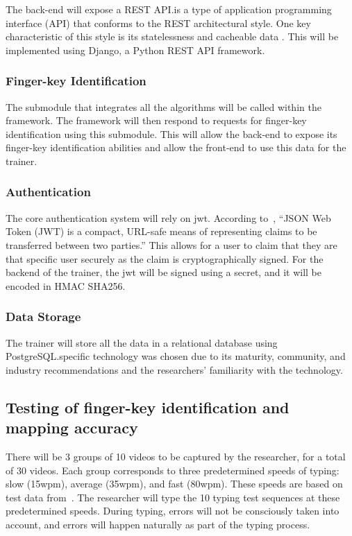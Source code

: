 \documentclass{report}
\begin{document}
The back-end will expose a REST API.\@This is a type of application programming
interface (API) that conforms to the REST architectural style. One key
characteristic of this style is its statelessness and cacheable data
\parencite{rest}. This will be implemented using Django, a Python REST API
framework.

\subsubsection{Finger-key Identification}
The submodule that integrates all the algorithms will be called within the
framework. The framework will then respond to requests for finger-key
identification using this submodule. This will allow the back-end to expose its
finger-key identification abilities and allow the front-end to use this data for
the trainer.

\subsubsection{Authentication}
The core authentication system will rely on \ac{jwt}. According to~\cite{jwt},
``JSON Web Token (JWT) is a compact, URL-safe means of representing claims to be
transferred between two parties.'' This allows for a user to claim that they are
that specific user securely as the claim is cryptographically signed. For the
backend of the trainer, the \ac{jwt} will be signed using a secret, and it will
be encoded in HMAC SHA256.

\subsubsection{Data Storage}
The trainer will store all the data in a relational database using
PostgreSQL.\@This specific technology was chosen due to its maturity, community,
and industry recommendations and the researchers' familiarity with the
technology.

\subsection{Testing of finger-key identification and mapping accuracy}

There will be 3 groups of 10 videos to be captured by the researcher, for a
total of 30 videos. Each group corresponds to three predetermined speeds of
typing: slow (15wpm), average (35wpm), and fast (80wpm). These speeds are based
on test data from~\cite{keybr}. The researcher will type the 10 typing test
sequences at these predetermined speeds. During typing, errors will not be
consciously taken into account, and errors will happen naturally as part of the
typing process.
\end{document}

